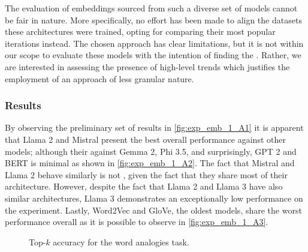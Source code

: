 
The evaluation of embeddings sourced from such a diverse set of models cannot be fair in nature.
More specifically, no effort has been made to align the datasets  these architectures were trained, opting for comparing their most popular iterations instead.
The chosen approach has clear limitations, but it is not within our scope to evaluate these models with the intention of finding the .
Rather, we are interested in assessing the presence of high-level trends which justifies the employment of an approach of less granular nature.

\subsubsection{Results}\label{sssec:exp_emb_exp1_results}

By observing the preliminary set of results in \cref{fig:exp_emb_1_A1} it is apparent that Llama 2 and Mistral present the best overall performance against other models; although their  against Gemma 2, Phi 3.5, and surprisingly, GPT 2 and BERT is minimal as shown in \cref{fig:exp_emb_1_A2}.
The fact that Mistral and Llama 2 behave similarly is not , given the fact that they share most of their architecture.
However, despite the fact that Llama 2 and Llama 3 have also similar architectures, Llama 3 demonstrates an exceptionally low performance on the experiment.
Lastly, Word2Vec and GloVe, the oldest models, share the worst performance overall as it is possible to observe in \cref{fig:exp_emb_1_A3}.

\begin{figure}[t!]
    \centering
    \quad
    \caption{Top-$k$ accuracy for the word analogies task.}
    \label{fig:exp_emb_1_A}
\end{figure}

